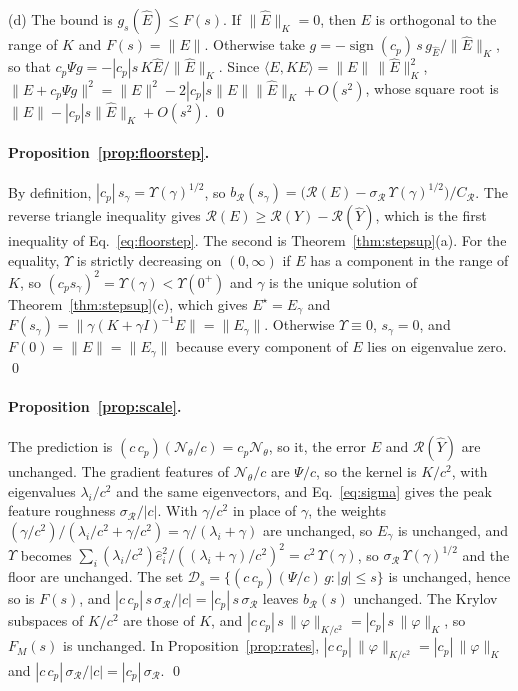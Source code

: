 \documentclass[11pt]{article}
\theoremstyle{definition}
\theoremstyle{remark}
\newcommand{\Net}{\mathcal{N}_\theta}    %
\newcommand{\Rgh}{\mathcal{R}}           %
\newcommand{\sR}{\sigma_{\Rgh}}
\newcommand{\CR}{C_{\Rgh}}
\newcommand{\ip}[2]{\langle #1,#2\rangle}
\begin{document}
(d) The bound is $g_s(\hat E) \le F(s)$.
If $\|\hat E\|_K = 0$, then $E$ is orthogonal to the range of $K$ and $F(s) = \|E\|$.
Otherwise take $g = -\operatorname{sign}(c_p)\,s\,g_{\hat E}/\|\hat E\|_K$, so that $c_p\Psi g = -|c_p|s\,K\hat E/\|\hat E\|_K$.
Since $\ip{E}{K\hat E} = \|E\|\,\|\hat E\|_K^2$, $\|E + c_p\Psi g\|^2 = \|E\|^2 - 2|c_p|s\|E\|\|\hat E\|_K + O(s^2)$, whose square root is $\|E\| - |c_p|s\|\hat E\|_K + O(s^2)$. \qed

\paragraph{Proposition~\ref{prop:floorstep}.}
By definition, $|c_p|\,s_\gamma = \Upsilon(\gamma)^{1/2}$, so $b_\Rgh(s_\gamma) = \big(\Rgh(E) - \sR\,\Upsilon(\gamma)^{1/2}\big)/\CR$.
The reverse triangle inequality gives $\Rgh(E) \ge \Rgh(Y) - \Rgh(\hat Y)$, which is the first inequality of Eq.~\eqref{eq:floorstep}.
The second is Theorem~\ref{thm:stepsup}(a).
For the equality, $\Upsilon$ is strictly decreasing on $(0,\infty)$ if $E$ has a component in the range of $K$, so $(c_ps_\gamma)^2 = \Upsilon(\gamma) < \Upsilon(0^+)$ and $\gamma$ is the unique solution of Theorem~\ref{thm:stepsup}(c), which gives $E^\star = E_\gamma$ and $F(s_\gamma) = \|\gamma(K+\gamma I)^{-1}E\| = \|E_\gamma\|$.
Otherwise $\Upsilon \equiv 0$, $s_\gamma = 0$, and $F(0) = \|E\| = \|E_\gamma\|$ because every component of $E$ lies on eigenvalue zero. \qed

\paragraph{Proposition~\ref{prop:scale}.}
The prediction is $(c\,c_p)(\Net/c) = c_p\Net$, so it, the error $E$ and $\Rgh(\hat Y)$ are unchanged.
The gradient features of $\Net/c$ are $\Psi/c$, so the kernel is $K/c^2$, with eigenvalues $\lambda_i/c^2$ and the same eigenvectors, and Eq.~\eqref{eq:sigma} gives the peak feature roughness $\sR/|c|$.
With $\gamma/c^2$ in place of $\gamma$, the weights $(\gamma/c^2)/(\lambda_i/c^2 + \gamma/c^2) = \gamma/(\lambda_i + \gamma)$ are unchanged, so $E_\gamma$ is unchanged, and $\Upsilon$ becomes $\sum_i (\lambda_i/c^2)\hat e_i^2/((\lambda_i + \gamma)/c^2)^2 = c^2\,\Upsilon(\gamma)$, so $\sR\,\Upsilon(\gamma)^{1/2}$ and the floor are unchanged.
The set $\mathcal{D}_s = \{(c\,c_p)(\Psi/c)\,g : |g| \le s\}$ is unchanged, hence so is $F(s)$, and $|c\,c_p|\,s\,\sR/|c| = |c_p|\,s\,\sR$ leaves $b_\Rgh(s)$ unchanged.
The Krylov subspaces of $K/c^2$ are those of $K$, and $|c\,c_p|\,s\,\|\varphi\|_{K/c^2} = |c_p|\,s\,\|\varphi\|_K$, so $F_M(s)$ is unchanged.
In Proposition~\ref{prop:rates}, $|c\,c_p|\,\|\varphi\|_{K/c^2} = |c_p|\,\|\varphi\|_K$ and $|c\,c_p|\,\sR/|c| = |c_p|\,\sR$. \qed
\end{document}
